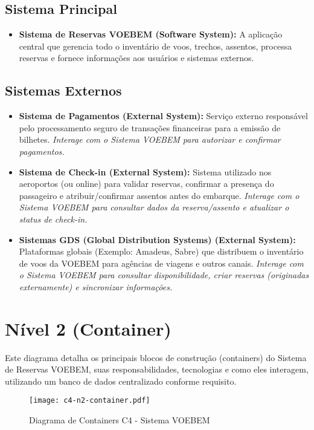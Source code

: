 \subsection{Sistema Principal}
\label{subsec:c4-contexto-sistema-principal}
\begin{itemize}
    \item \textbf{Sistema de Reservas VOEBEM (Software System):} A aplicação central que gerencia todo o inventário de voos, trechos, assentos, processa reservas e fornece informações aos usuários e sistemas externos.
\end{itemize}

\subsection{Sistemas Externos}
\label{subsec:c4-contexto-sistemas-externos}
\begin{itemize}
    \item \textbf{Sistema de Pagamentos (External System):} Serviço externo responsável pelo processamento seguro de transações financeiras para a emissão de bilhetes. \textit{Interage com o Sistema VOEBEM para autorizar e confirmar pagamentos.}
    \item \textbf{Sistema de Check-in (External System):} Sistema utilizado nos aeroportos (ou online) para validar reservas, confirmar a presença do passageiro e atribuir/confirmar assentos antes do embarque. \textit{Interage com o Sistema VOEBEM para consultar dados da reserva/assento e atualizar o status de check-in.}
    \item \textbf{Sistemas GDS (Global Distribution Systems) (External System):} Plataformas globais (Exemplo: Amadeus, Sabre) que distribuem o inventário de voos da VOEBEM para agências de viagens e outros canais. \textit{Interage com o Sistema VOEBEM para consultar disponibilidade, criar reservas (originadas externamente) e sincronizar informações.}
\end{itemize}

\section{Nível 2 (Container)}
\label{sec:c4-container}

Este diagrama detalha os principais blocos de construção (containers) do Sistema de Reservas VOEBEM, suas responsabilidades, tecnologias e como eles interagem, utilizando um banco de dados centralizado conforme requisito.

\begin{figure}[htbp]
    \centering
    \texttt{[image: c4-n2-container.pdf]}
    \caption{Diagrama de Containers C4 - Sistema VOEBEM}
    \label{fig:c4-container}
\end{figure}

